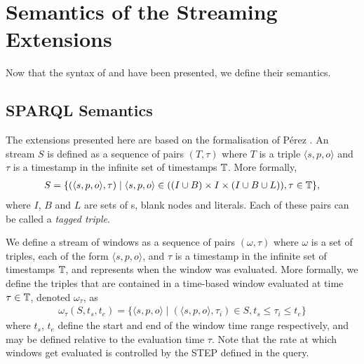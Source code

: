 \section{Semantics of the Streaming Extensions}
\label{semanticsstreaming}

Now that the syntax of \sparqlstr and \stwoo have been presented, we define their semantics.

\subsection{SPARQL Semantics}
\label{sparqlstrsemantics}

The \sparql extensions presented here are based on the formalisation of %
P\'erez \etal \cite{Perez_09}.
An \rdf stream $S$ is defined as a sequence of pairs $(T,\tau)$ where $T$ is a triple  $\langle s,p,o \rangle$ and $\tau$ is a timestamp in the infinite set of timestamps $\mathbb{T}$.
More formally, 
\begin{align*}
  S = \{( \langle s,p,o \rangle, \tau) \mid \langle s,p,o \rangle \in ((I \cup B) \times I \times (I \cup B \cup L)  ), \tau \in \mathbb{T}\},
\end{align*}
where $I$, $B$ and $L$ are sets of \iri \!\!s, blank nodes and literals. 
Each of these pairs can be called a \emph{tagged triple}.

We define a stream of windows as a sequence of pairs $(\omega, \tau)$ where $\omega$ is a set of triples, each of the form $\langle s, p, o \rangle$, and $\tau$ is a timestamp in the infinite set of timestamps $\mathbb{T}$, and represents when the window was evaluated.
More formally, we define the triples that are contained in a time-based window evaluated at time $\tau \in \mathbb{T}$, denoted $\omega_{\tau}$, as
\begin{align*}
  \omega_{\tau}(S,t_{s},t_{e})=\{ \langle s,p,o \rangle \mid (\langle s,p,o \rangle, \tau_i) \in S, t_{s} \leq \tau_i \leq t_{e}\}
\end{align*}
where $t_s$, $t_e$ define the start and end of the window time range respectively, and may be defined relative to the evaluation time $\tau$. 
Note that the rate at which windows get evaluated is controlled by the \textsf{STEP} defined in the query.%

